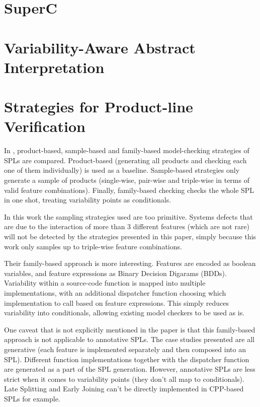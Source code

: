 \documentclass[11pt]{article}
\begin{document}
\section{SuperC}
\cite{Gazzillo:2012}

\section{Variability-Aware Abstract Interpretation}
\cite{Midtgaard:2015}

\section{Strategies for Product-line Verification}

In \cite{Apel:2013}, product-based, sample-based and family-based model-checking strategies of SPLs are compared. Product-based (generating all products and checking each one of them individually) is used as a baseline. Sample-based strategies only generate a sample of products (single-wise, pair-wise and triple-wise in terms of valid feature combinations). Finally, family-based checking checks the whole SPL in one shot, treating variability points as conditionals.

In this work the sampling strategies used are too primitive. Systems defects that are due to the interaction of more than 3 different features (which are not rare) will not be detected by the strategies presented in this paper, simply because this work only samples up to triple-wise feature combinations.

Their family-based approach is more interesting. Features are encoded as boolean variables, and feature expressions as Binary Decision Digarams (BDDs). Variability within a source-code function is mapped into multiple implementations, with an additional dispatcher function choosing which implementation to call based on feature expressions. This simply reduces variability into conditionals, allowing existing model checkers to be used as is.

One caveat that is not explicitly mentioned in the paper is that this family-based approach is not applicable to annotative SPLs. The case studies presented are all generative (each feature is implemented separately and then composed into an SPL). Different function implementations together with the dispatcher function are generated as a part of the SPL generation. However, annotative SPLs are less strict when it comes to variability points (they don't all map to conditionals). Late Splitting and Early Joining can't be directly implemented in CPP-based SPLs for example.
\end{document}
